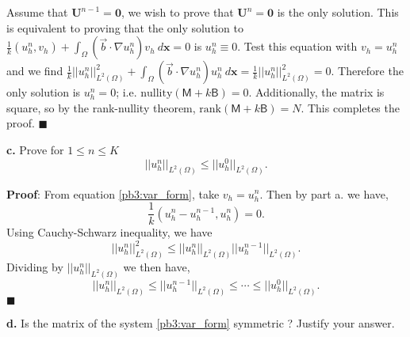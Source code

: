 \documentclass[11pt]{article}
\newcommand{\bs}{\boldsymbol}
\begin{document}
Assume that $\mathbf{U}^{n-1} = \bs{0}$, we wish to prove that $\mathbf{U}^n = \bs{0}$ is the only solution.
This is equivalent to proving that the only solution to $\frac1k (u^n_h,v_h) + \int_\Omega (\vec{b} \cdot \nabla u^n_h) v_h \: d\bs{x} = 0$ is $u^n_h \equiv 0$. 
Test this equation with $v_h = u^n_h$ and we find $\frac1k ||u^n_h||^2_{L^2(\Omega)} + \int_\Omega (\vec{b} \cdot \nabla u^n_h) u^n_h \: d\bs{x} = \frac1k ||u^n_h||^2_{L^2(\Omega)}  = 0$.
Therefore the only solution is $u^n_h = 0$; i.e. $\text{nullity}(\mathsf{M} + k\mathsf{B}) = 0$. 
Additionally, the matrix is square, so by the rank-nullity theorem, $\text{rank}(\mathsf{M} + k\mathsf{B}) = N$.
This completes the proof.
$\blacksquare$



\vskip 2cm



\textbf{c.} Prove for $1 \leq n \leq K$
\begin{equation}
    ||u^n_h||_{L^2(\Omega)} \leq ||u^0_h||_{L^2(\Omega)}.
\end{equation}

\vskip 1cm


\textbf{Proof}: From equation \eqref{pb3:var_form}, take $v_h = u^n_h$.
Then by part a. we have,
\begin{equation*}
    \frac{1}{k} (u^n_h - u^{n-1}_h, u^n_h) = 0.
\end{equation*}
Using Cauchy-Schwarz inequality, we have
\begin{equation*}
    ||u^n_h||^2_{L^2(\Omega)} \leq ||u^n_h||_{L^2(\Omega)} ||u^{n-1}_h||_{L^2(\Omega)}.
\end{equation*}
Dividing by $||u^n_h||_{L^2(\Omega)}$ we then have,
\begin{equation*}
    ||u^n_h||_{L^2(\Omega)} \leq ||u^{n-1}_h||_{L^2(\Omega)} \leq \cdots \leq ||u^0_h||_{L^2(\Omega)}.
\end{equation*}
$\blacksquare$



\vskip 2cm


\textbf{d.}  Is the matrix of the system \eqref{pb3:var_form} symmetric ? Justify your answer.

\vskip 1cm
\end{document}
